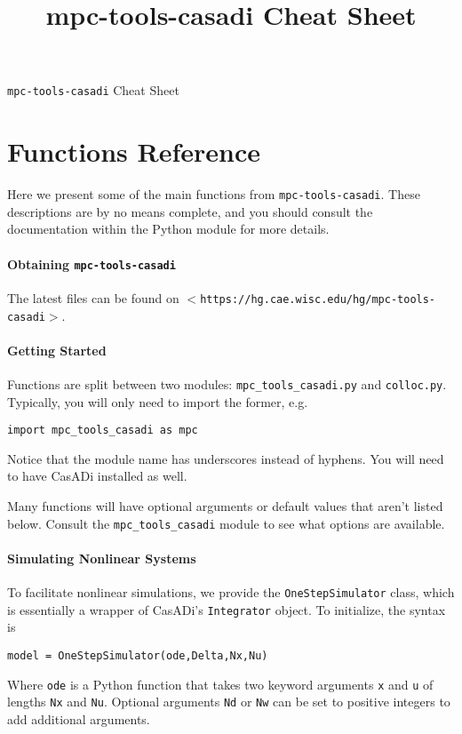 \documentclass{article}
\title{mpc-tools-casadi Cheat Sheet}
\newcommand{\smallurl}[1]{\texttt{\scriptsize$<$#1$>$}}
\newcommand{\casadi}{CasADi}
\begin{document}

\begin{center}
    \LARGE \texttt{mpc-tools-casadi} Cheat Sheet
\end{center}

\section{Functions Reference}

Here we present some of the main functions from \texttt{mpc-tools-casadi}.
These descriptions are by no means complete, and you should consult the documentation within the Python module for more details.

\begin{multicols}{2}

\paragraph*{Obtaining \texttt{mpc-tools-casadi}}

The latest files can be found on \smallurl{https://hg.cae.wisc.edu/hg/mpc-tools-casadi}.

\paragraph*{Getting Started}

Functions are split between two modules: \texttt{mpc\_tools\_casadi.py} and \texttt{colloc.py}.
Typically, you will only need to import the former, e.g.
%
\begin{lstlisting}[frame=L]
import mpc_tools_casadi as mpc
\end{lstlisting}
%
Notice that the module name has underscores instead of hyphens.
You will need to have \casadi{} installed as well.

Many functions will have optional arguments or default values that aren't listed below.
Consult the \texttt{mpc\_tools\_casadi} module to see what options are available.

\paragraph*{Simulating Nonlinear Systems}

To facilitate nonlinear simulations, we provide the \texttt{OneStepSimulator} class, which is essentially a wrapper of \casadi's \texttt{Integrator} object.
To initialize, the syntax is
%
\begin{lstlisting}[frame=L]
model = OneStepSimulator(ode,Delta,Nx,Nu)
\end{lstlisting}
%
Where \texttt{ode} is a Python function that takes two keyword arguments \texttt{x} and \texttt{u} of lengths \texttt{Nx} and \texttt{Nu}.
Optional arguments \texttt{Nd} or \texttt{Nw} can be set to positive integers to add additional arguments.


\end{multicols}
\end{document}
